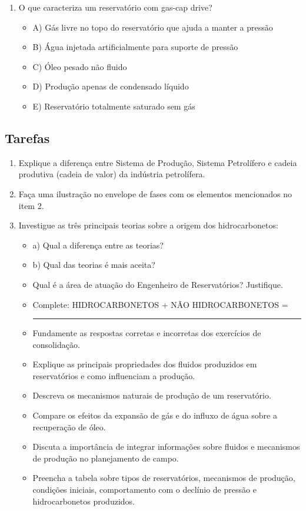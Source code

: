 \documentclass[11pt,a4paper]{article}
\begin{document}
\begin{enumerate}
\item O que caracteriza um reservatório com gas-cap drive?
\begin{itemize}
\item A) Gás livre no topo do reservatório que ajuda a manter a pressão
\item B) Água injetada artificialmente para suporte de pressão
\item C) Óleo pesado não fluido
\item D) Produção apenas de condensado líquido
\item E) Reservatório totalmente saturado sem gás
\end{itemize}
\end{enumerate}

\subsection{Tarefas}
\begin{enumerate}
\item Explique a diferença entre Sistema de Produção, Sistema Petrolífero e cadeia produtiva (cadeia de valor) da indústria petrolífera.
\item Faça uma ilustração no envelope de fases com os elementos mencionados no item 2.
\item Investigue as três principais teorias sobre a origem dos hidrocarbonetos:
\begin{itemize}
\item a) Qual a diferença entre as teorias?
\item b) Qual das teorias é mais aceita?
\item Qual é a área de atuação do Engenheiro de Reservatórios? Justifique.
\item Complete: HIDROCARBONETOS + NÃO HIDROCARBONETOS = \rule{6cm}{0.5pt}
\item Fundamente as respostas corretas e incorretas dos exercícios de consolidação.
\item Explique as principais propriedades dos fluidos produzidos em reservatórios e como influenciam a produção.
\item Descreva os mecanismos naturais de produção de um reservatório.
\item Compare os efeitos da expansão de gás e do influxo de água sobre a recuperação de óleo.
\item Discuta a importância de integrar informações sobre fluidos e mecanismos de produção no planejamento de campo.
\item Preencha a tabela sobre tipos de reservatórios, mecanismos de produção, condições iniciais, comportamento com o declínio de pressão e hidrocarbonetos produzidos.
\end{itemize}
\end{enumerate}
\end{document}
